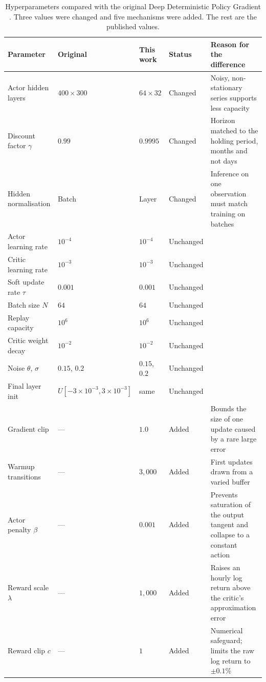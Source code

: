 \begin{table}[htb!]
\centering
\footnotesize
\caption{Hyperparameters compared with the original Deep Deterministic Policy Gradient \cite{lillicrap_continuous_2015}. Three values were changed and five mechanisms were added. The rest are the published values.}
\label{Tables:Hyperparameters}
\begin{tabularx}{\textwidth}{@{}llll X@{}}
\toprule
\textbf{Parameter} & \textbf{Original} & \textbf{This work} & \textbf{Status} & \textbf{Reason for the difference} \\
\midrule
Actor hidden layers & $400 \times 300$ & $64 \times 32$ & Changed & Noisy, non-stationary series supports less capacity \\
Discount factor $\gamma$ & $0.99$ & $0.9995$ & Changed & Horizon matched to the holding period, months and not days \\
Hidden normalisation & Batch & Layer & Changed & Inference on one observation must match training on batches \\
\addlinespace
Actor learning rate & $10^{-4}$ & $10^{-4}$ & Unchanged & \\
Critic learning rate & $10^{-3}$ & $10^{-3}$ & Unchanged & \\
Soft update rate $\tau$ & $0.001$ & $0.001$ & Unchanged & \\
Batch size $N$ & $64$ & $64$ & Unchanged & \\
Replay capacity & $10^{6}$ & $10^{6}$ & Unchanged & \\
Critic weight decay & $10^{-2}$ & $10^{-2}$ & Unchanged & \\
Noise $\theta$, $\sigma$ & $0.15$, $0.2$ & $0.15$, $0.2$ & Unchanged & \\
Final layer init & $U[-3\!\times\!10^{-3}, 3\!\times\!10^{-3}]$ & same & Unchanged & \\
\addlinespace
Gradient clip & --- & $1.0$ & Added & Bounds the size of one update caused by a rare large error \\
Warmup transitions & --- & $3{,}000$ & Added & First updates drawn from a varied buffer \\
Actor penalty $\beta$ & --- & $0.001$ & Added & Prevents saturation of the output tangent and collapse to a constant action \\
Reward scale $\lambda$ & --- & $1{,}000$ & Added & Raises an hourly log return above the critic's approximation error \\
Reward clip $c$ & --- & $1$ & Added & Numerical safeguard; limits the raw log return to $\pm 0.1\%$ \\
\bottomrule
\end{tabularx}
\end{table}